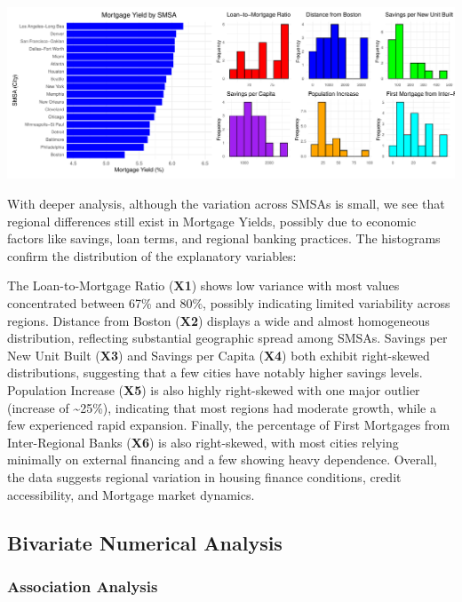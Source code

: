 \documentclass[
  11pt,
]{article}
\begin{document}
\includegraphics{Figs/unnamed-chunk-4-1.pdf}

With deeper analysis, although the variation across SMSAs is small, we
see that regional differences still exist in Mortgage Yields, possibly
due to economic factors like savings, loan terms, and regional banking
practices. The histograms confirm the distribution of the explanatory
variables:

The Loan-to-Mortgage Ratio (\textbf{X1}) shows low variance with most
values concentrated between 67\% and 80\%, possibly indicating limited
variability across regions. Distance from Boston (\textbf{X2}) displays
a wide and almost homogeneous distribution, reflecting substantial
geographic spread among SMSAs. Savings per New Unit Built (\textbf{X3})
and Savings per Capita (\textbf{X4}) both exhibit right-skewed
distributions, suggesting that a few cities have notably higher savings
levels. Population Increase (\textbf{X5}) is also highly right-skewed
with one major outlier (increase of \textasciitilde25\%), indicating
that most regions had moderate growth, while a few experienced rapid
expansion. Finally, the percentage of First Mortgages from
Inter-Regional Banks (\textbf{X6}) is also right-skewed, with most
cities relying minimally on external financing and a few showing heavy
dependence. Overall, the data suggests regional variation in housing
finance conditions, credit accessibility, and Mortgage market dynamics.

\subsection{Bivariate Numerical
Analysis}\label{bivariate-numerical-analysis}

\subsubsection{Association Analysis}\label{association-analysis}
\end{document}

